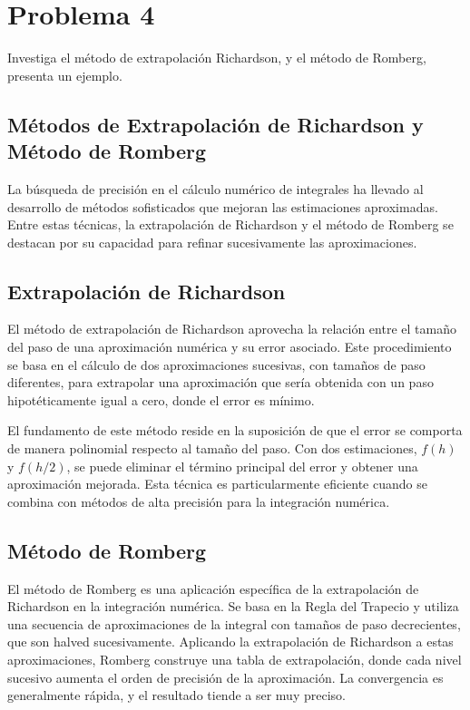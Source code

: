 \documentclass{article}
\begin{document}
\section{Problema 4}


Investiga el método de extrapolación Richardson, y el método de Romberg, presenta un ejemplo. 

\subsection{Métodos de Extrapolación de Richardson y Método de Romberg}

La búsqueda de precisión en el cálculo numérico de integrales ha llevado al desarrollo de métodos sofisticados que mejoran las estimaciones aproximadas. Entre estas técnicas, la extrapolación de Richardson y el método de Romberg se destacan por su capacidad para refinar sucesivamente las aproximaciones. \cite{burden2015numerical}

\subsection{Extrapolación de Richardson}

El método de extrapolación de Richardson aprovecha la relación entre el tamaño del paso de una aproximación numérica y su error asociado. Este procedimiento se basa en el cálculo de dos aproximaciones sucesivas, con tamaños de paso diferentes, para extrapolar una aproximación que sería obtenida con un paso hipotéticamente igual a cero, donde el error es mínimo. 

El fundamento de este método reside en la suposición de que el error se comporta de manera polinomial respecto al tamaño del paso. Con dos estimaciones, \( f(h) \) y \( f(h/2) \), se puede eliminar el término principal del error y obtener una aproximación mejorada. Esta técnica es particularmente eficiente cuando se combina con métodos de alta precisión para la integración numérica. \cite{burden2015numerical}

\subsection{Método de Romberg}

El método de Romberg es una aplicación específica de la extrapolación de Richardson en la integración numérica. Se basa en la Regla del Trapecio y utiliza una secuencia de aproximaciones de la integral con tamaños de paso decrecientes, que son halved sucesivamente. Aplicando la extrapolación de Richardson a estas aproximaciones, Romberg construye una tabla de extrapolación, donde cada nivel sucesivo aumenta el orden de precisión de la aproximación. La convergencia es generalmente rápida, y el resultado tiende a ser muy preciso. \cite{burden2015numerical}
\end{document}
